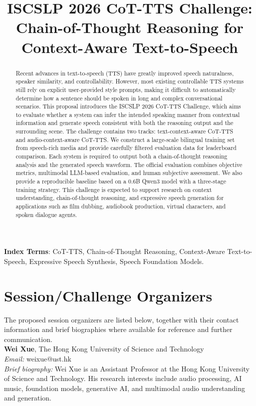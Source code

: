 \documentclass[a4paper]{article}
\title{ISCSLP 2026 CoT-TTS Challenge: Chain-of-Thought Reasoning for Context-Aware Text-to-Speech}
\begin{document}
\maketitle

\begin{abstract}
Recent advances in text-to-speech (TTS) have greatly improved speech naturalness, speaker similarity, and controllability. However, most existing controllable TTS systems still rely on explicit user-provided style prompts, making it difficult to automatically determine how a sentence should be spoken in long and complex conversational scenarios. This proposal introduces the ISCSLP 2026 CoT-TTS Challenge, which aims to evaluate whether a system can infer the intended speaking manner from contextual information and generate speech consistent with both the reasoning output and the surrounding scene. The challenge contains two tracks: text-context-aware CoT-TTS and audio-context-aware CoT-TTS. We construct a large-scale bilingual training set from speech-rich media and provide carefully filtered evaluation data for leaderboard comparison. Each system is required to output both a chain-of-thought reasoning analysis and the generated speech waveform. The official evaluation combines objective metrics, multimodal LLM-based evaluation, and human subjective assessment. We also provide a reproducible baseline based on a 0.6B Qwen3 model with a three-stage training strategy. This challenge is expected to support research on context understanding, chain-of-thought reasoning, and expressive speech generation for applications such as film dubbing, audiobook production, virtual characters, and spoken dialogue agents.
\end{abstract}
\noindent\textbf{Index Terms}: CoT-TTS, Chain-of-Thought Reasoning, Context-Aware Text-to-Speech, Expressive Speech Synthesis, Speech Foundation Models.


\section{Session/Challenge Organizers}

The proposed session organizers are listed below, together with their contact information and brief biographies where available for reference and further communication.\\

\noindent\textbf{Wei Xue}, The Hong Kong University of Science and Technology\\
\textit{Email:} weixue@ust.hk\\
\textit{Brief biography:} Wei Xue is an Assistant Professor at the Hong Kong University of Science and Technology. His research interests include audio processing, AI music, foundation models, generative AI, and multimodal audio understanding and generation.\\
\end{document}
